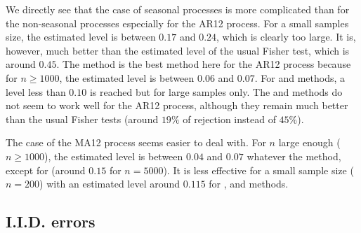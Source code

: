 We directly see  that the case of seasonal processes is more complicated than for the non-seasonal processes especially for the AR12 process. For a small samples size, the estimated level is between $0.17$ and $0.24$, which is clearly too large. It is, however, much better than the estimated level of the usual Fisher test, which is around $0.45$.
The  method is the best method here for the AR12 process because for $n \geq 1000$, the estimated level is between $0.06$ and $0.07$.
For  and  methods, a level less than $0.10$ is reached but for large samples only. The  and  methods do not seem to work well for the AR12 process, although they remain much better than the usual Fisher tests (around $19\%$ of rejection instead of $45\%$). 

The case of the MA12 process seems easier to deal with. For $n$ large enough ($n \geq 1000$), the estimated level is between $0.04$ and $0.07$ whatever the method, except for  (around $0.15$ for $n = 5000$). It is less effective for a small sample size ($n=200$) with an estimated level around $0.115$ for ,  and  methods.

\subsection{I.I.D. errors}

